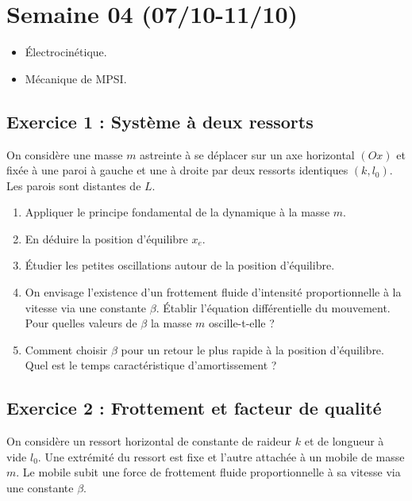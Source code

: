 \section{Semaine 04 (07/10-11/10) }


\begin{itemize}
	\item Électrocinétique.
	\item Mécanique de MPSI.
\end{itemize}

\subsection{Exercice 1 : Système à deux ressorts}

On considère une masse $m$ astreinte à se déplacer sur un axe horizontal $(Ox)$ et fixée à une paroi à gauche et une à droite par deux ressorts identiques $(k, l_0)$. Les parois sont distantes de $L$.

\begin{enumerate}
	\item Appliquer le principe fondamental de la dynamique à la masse $m$.
	\item En déduire la position d'équilibre $x_e$.
	\item Étudier les petites oscillations autour de la position d'équilibre.
	\item On envisage l'existence d'un frottement fluide d'intensité proportionnelle à la vitesse via une constante $\beta$. Établir l'équation différentielle du mouvement. Pour quelles valeurs de $\beta$ la masse $m$ oscille-t-elle ?
	\item Comment choisir $\beta$ pour un retour le plus rapide à la position d'équilibre. Quel est le temps caractéristique d'amortissement ?
\end{enumerate}

\subsection{Exercice 2 : Frottement et facteur de qualité}

On considère un ressort horizontal de constante de raideur $k$ et de longueur à vide $l_0$. Une extrémité du ressort est fixe et l'autre attachée à un mobile de masse $m$. Le mobile subit une force de frottement fluide proportionnelle à sa vitesse via une constante $\beta$.

